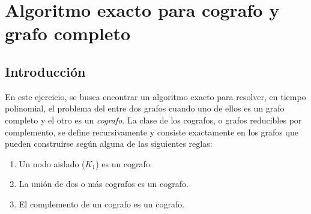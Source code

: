 \section{Algoritmo exacto para cografo y grafo completo}


\subsection{Introducción}
En este ejercicio, se busca encontrar un algoritmo exacto para resolver, en
tiempo polinomial, el problema del  entre dos grafos cuando uno de
ellos es un grafo completo y el otro es un \emph{cografo}. La clase de los
cografos, o grafos reducibles por complemento, se define recursivamente y
consiste exactamente en los grafos que pueden construirse según alguna de las
siguientes reglas:
\begin{enumerate}
    \item Un nodo aislado ($K_1$) es un cografo.
    \item La unión de dos o más cografos es un cografo.
    \item El complemento de un cografo es un cografo.
\end{enumerate}

